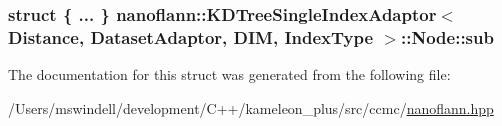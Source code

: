 \hypertarget{structnanoflann_1_1_k_d_tree_single_index_adaptor_1_1_node_a0f18e3c2f42717cce686aeb378f77a21}{
\subsubsection[{sub}]{\setlength{\rightskip}{0pt plus 5cm}struct \{ ... \}   {\bf nanoflann\-::\-K\-D\-Tree\-Single\-Index\-Adaptor}$<$ Distance, Dataset\-Adaptor, D\-I\-M, Index\-Type $>$\-::Node\-::sub}}\label{structnanoflann_1_1_k_d_tree_single_index_adaptor_1_1_node_a0f18e3c2f42717cce686aeb378f77a21}


The documentation for this struct was generated from the following file\-:\begin{DoxyCompactItemize}
\item 
/\-Users/mswindell/development/\-C++/kameleon\-\_\-plus/src/ccmc/\hyperlink{nanoflann_8hpp}{nanoflann.\-hpp}\end{DoxyCompactItemize}
